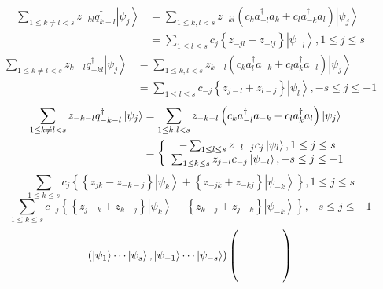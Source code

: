 \documentclass[aps,preprint]{revtex4}%
\begin{document}
\begin{align}
\sum_{1\leq k\neq l<s}z_{-kl}q_{k-l}^{\dagger}\left\vert \psi_{j}%
\right\rangle  &  =\sum_{1\leq k,l<s}z_{-kl}\left(  c_{k}a_{-l}^{\dagger}%
a_{k}+c_{l}a_{-k}^{\dagger}a_{l}\right)  \left\vert \psi_{j}\right\rangle \\
&  =\sum_{1\leq l\leq s}c_{j}\left\{  z_{-jl}+z_{-lj}\right\}  \left\vert
\psi_{-l}\right\rangle ,1\leq j\leq s
\end{align}%
\begin{align}
\sum_{1\leq k\neq l<s}z_{k-l}q_{-kl}^{\dagger}\left\vert \psi_{j}%
\right\rangle  &  =\sum_{1\leq k,l<s}z_{k-l}\left(  c_{k}a_{l}^{\dagger}%
a_{-k}+c_{l}a_{k}^{\dagger}a_{-l}\right)  \left\vert \psi_{j}\right\rangle \\
&  =\sum_{1\leq l\leq s}c_{-j}\left\{  z_{j-l}+z_{l-j}\right\}  \left\vert
\psi_{l}\right\rangle ,-s\leq j\leq-1
\end{align}%
\begin{align}
\sum_{1\leq k\neq l<s}z_{-k-l}q_{-k-l}^{\dagger}\left\vert \psi_{j}%
\right\rangle  &  =\sum_{1\leq k,l<s}z_{-k-l}\left(  c_{k}a_{-l}^{\dagger
}a_{-k}-c_{l}a_{k}^{\dagger}a_{l}\right)  \left\vert \psi_{j}\right\rangle \\
&  =\left\{
\begin{array}
[c]{c}%
-\sum_{1\leq l\leq s}z_{-l-j}c_{j}\left\vert \psi_{l}\right\rangle ,1\leq
j\leq s\\
\sum_{1\leq k\leq s}z_{j-l}c_{-j}\left\vert \psi_{-l}\right\rangle ,-s\leq
j\leq-1
\end{array}
\right.
\end{align}%
\begin{equation}
\sum_{1\leq k\leq s}c_{j}\left\{  \left\{  z_{jk}-z_{-k-j}\right\}  \left\vert
\psi_{k}\right\rangle +\left\{  z_{-jk}+z_{-kj}\right\}  \left\vert \psi
_{-k}\right\rangle \right\}  ,1\leq j\leq s
\end{equation}%
\begin{equation}
\sum_{1\leq k\leq s}c_{-j}\left\{  \left\{  z_{j-k}+z_{k-j}\right\}
\left\vert \psi_{k}\right\rangle -\left\{  z_{k-j}+z_{j-k}\right\}  \left\vert
\psi_{-k}\right\rangle \right\}  ,-s\leq j\leq-1
\end{equation}%
\begin{equation}
\left(  \left\vert \psi_{1}\right\rangle \cdots\left\vert \psi_{s}%
\right\rangle ,\left\vert \psi_{-1}\right\rangle \cdots\left\vert \psi
_{-s}\right\rangle \right)  \left(
\begin{array}
[c]{cccc}
&  &  & \\
&  &  & \\
&  &  & \\
&  &  &
\end{array}
\right)
\end{equation}
\end{document}
